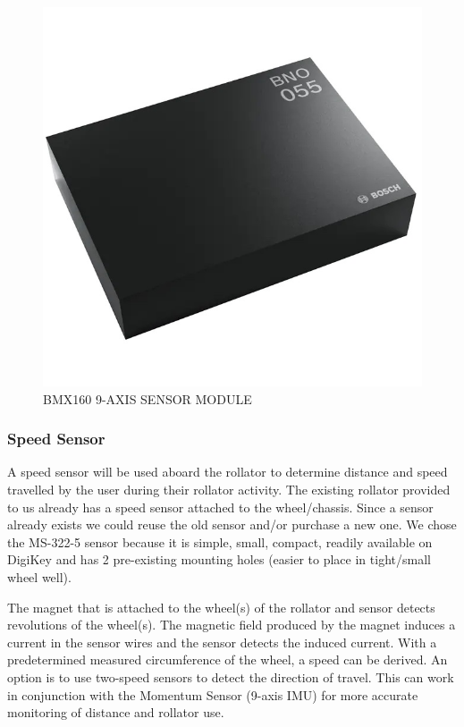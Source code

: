 \documentclass{article}
\begin{document}
\begin{figure}[!h]
    \centering
    \includegraphics[scale=0.25]{MFG_BNO055.jpg}
    \caption{BMX160 9-AXIS SENSOR MODULE}
    \label{fig:5}
\end{figure}


\subsubsection{Speed Sensor}
A speed sensor will be used aboard the rollator to determine distance and speed travelled by the user during their rollator activity.
The existing rollator provided to us already has a speed sensor attached to the wheel/chassis. Since a sensor already exists we could reuse the old sensor and/or purchase a new one. We chose the MS-322-5 sensor because it is simple, small, compact, readily available on DigiKey and has 2 pre-existing mounting holes (easier to place in tight/small wheel well).

The magnet that is attached to the wheel(s) of the rollator and sensor detects revolutions of the wheel(s). The magnetic field produced by the magnet induces a current in the sensor wires and the sensor detects 
the induced current. With a predetermined measured circumference of the wheel, a speed can be derived. An option is to use two-speed sensors to detect the direction of travel. This can work in conjunction with the Momentum Sensor (9-axis IMU) for more accurate monitoring of distance and rollator use.
\end{document}
